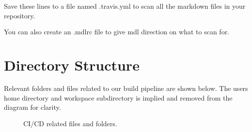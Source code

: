 Save these lines to a file named .travis.yml to scan all the markdown files in your repository.

\justify
%	

\justify
You can also create an .mdlrc file to give mdl direction on what to scan for.

\justify
%	

\clearpage

\section{Directory Structure}

\justify
Relevant folders and files related to our build pipeline are shown below. The users home directory
and workspace subdirectory is implied and removed from the diagram for clarity.

\begin{figure}[!htb]
	
	\caption{CI/CD related files and folders.}
\end{figure}
